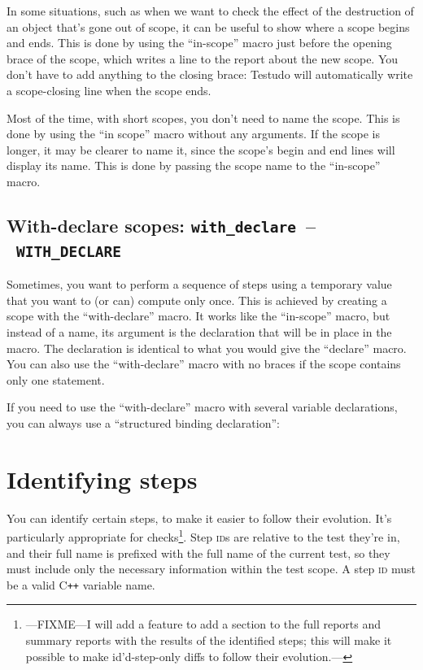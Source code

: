 \documentclass[twoside, a4paper, article]{memoir}
\newcommand*\testudocolor{\color{red!80!blue}}
\newcommand*\testudo[1]{\texttt{\testudocolor{}#1}}
\newcommand*\testudopair[2]{\testudo{#1}~--~\testudo{#2}}
\newcommand\subsectiontestudopair[3]{%
  \subsection[#1]{#1: \testudopair{#2}{#3}}}
\providecommand\typesetexample[1]{%
}
\newcommand*\Cpp{C\texttt{++}}
\begin{document}
In some situations, such as when we want to check the effect of the destruction
of an object that's gone out of scope, it can be useful to show where a scope
begins and ends.  This is done by using the ``in-scope'' macro just before the
opening brace of the scope, which writes a line to the report about the new
scope.  You don't have to add anything to the closing brace: Testudo will
automatically write a scope-closing line when the scope ends.

Most of the time, with short scopes, you don't need to name the scope.  This is
done by using the ``in scope'' macro without any arguments.  If the scope is
longer, it may be clearer to name it, since the scope's begin and end lines
will display its name.  This is done by passing the scope name to the
``in-scope'' macro.

\typesetexample{in-scope}

\subsectiontestudopair{With-declare scopes}{with\_declare}{WITH\_DECLARE}
\label{sec:with-declare-scopes}

Sometimes, you want to perform a sequence of steps using a temporary value that
you want to (or can) compute only once.  This is achieved by creating a scope
with the ``with-declare'' macro.  It works like the ``in-scope'' macro, but
instead of a name, its argument is the declaration that will be in place in the
macro.  The declaration is identical to what you would give the ``declare''
macro.  You can also use the ``with-declare'' macro with no braces if the scope
contains only one statement.

\typesetexample{with-declare}

If you need to use the ``with-declare'' macro with several variable
declarations, you can always use a ``structured binding declaration'':

\typesetexample{with-declare-several}

\section{Identifying steps}
\label{sec:identifying-steps}

You can identify certain steps, to make it easier to follow their evolution.
It's particularly appropriate for checks\footnote{---FIXME---I will add a
  feature to add a section to the full reports and summary reports with the
  results of the identified steps; this will make it possible to make
  id'd-step-only diffs to follow their evolution.---}.  Step \textsc{id}s are
relative to the test they're in, and their full name is prefixed with the full
name of the current test, so they must include only the necessary information
within the test scope.  A step \textsc{id} must be a valid \Cpp{} variable
name.
\end{document}
